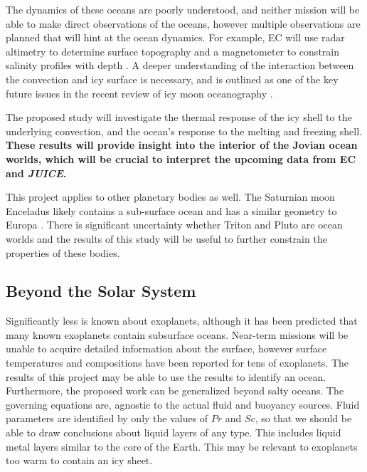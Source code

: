 \documentclass[12pt]{article}
\begin{document}
The dynamics of these oceans are poorly understood, and neither mission will be able to make direct observations of the oceans, however multiple observations are planned that will hint at the ocean dynamics. For example, EC will use radar altimetry to determine surface topography and a magnetometer to constrain salinity profiles with depth \citep{jR23}.  
A deeper understanding of the interaction between the convection and icy surface is necessary, and is outlined as one of the key future issues in the recent review of icy moon oceanography \citep{kS24}.


The proposed study will investigate the thermal response of the icy shell to the underlying convection, and the ocean's response to the melting and freezing shell. 
\textbf{These results will provide insight into the interior of the Jovian ocean worlds, which will be crucial to interpret the upcoming data from EC and \textit{JUICE}.}

This project applies to other planetary bodies as well. The Saturnian moon Enceladus likely contains a sub-surface ocean and has a similar geometry to Europa \citep{kS24}. There is significant uncertainty whether Triton \citep{jK22} and Pluto \citep{kS24} are ocean worlds and the results of this study will be useful to further constrain the properties of these bodies. 

\subsection{Beyond the Solar System}
Significantly less is known about exoplanets, although it has been predicted that many known exoplanets contain subsurface oceans\citep{lQ20}. Near-term missions will be unable to acquire detailed information about the surface, however surface temperatures and compositions have been reported for tens of exoplanets\citep{nM19}. The results of this project may be able to use the results to identify an ocean. Furthermore, the proposed work can be generalized beyond salty oceans. The governing equations are, agnostic to the actual fluid and buoyancy sources. Fluid parameters are identified by only the values of $Pr$ and $Sc$, so that we should be able to draw conclusions about liquid layers of any type. This includes liquid metal layers similar to the core of the Earth. This may be relevant to exoplanets too warm to contain an icy sheet.
\end{document}
